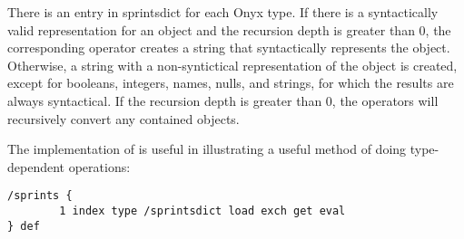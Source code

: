 There is an entry in sprintsdict for each Onyx type.  If there is a
syntactically valid representation for an object and the recursion depth is
greater than 0, the corresponding operator creates a string that syntactically
represents the object.  Otherwise, a string with a non-syntictical
representation of the object is created, except for booleans, integers, names,
nulls, and strings, for which the results are always syntactical.  If the
recursion depth is greater than 0, the operators will recursively convert any
contained objects.

The implementation of  is
useful in illustrating a useful method of doing type-dependent operations:

\begin{verbatim}
/sprints {
        1 index type /sprintsdict load exch get eval
} def
\end{verbatim}

